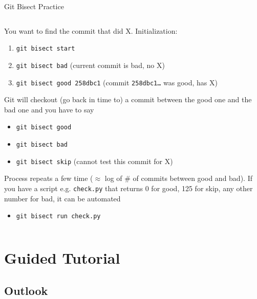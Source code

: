 \documentclass[xetex]{beamer}
\begin{document}
\begin{frame}{Git Bisect Practice}
  \begin{columns}
    \begin{column}{\linewidth}
        You want to find the commit that did X. Initialization:
        \begin{enumerate}
          \item \texttt{git bisect start}
          \item \texttt{git bisect bad} (current commit is bad, no X)
          \item \texttt{git bisect good 258dbc1} (commit \texttt{258dbc1\ldots}
            was good, has X)
        \end{enumerate}
        \pause
        Git will checkout (go back in time to) a commit between the good one
        and the bad one and you have to say
        \begin{itemize}
          \item \texttt{git bisect good}
          \item \texttt{git bisect bad}
          \item \texttt{git bisect skip} (cannot test this commit for X)
        \end{itemize}
        \pause
        Process repeats a few time ($\approx$ log of \# of commits between good
        and bad). If you have a script e.g. \texttt{check.py} that returns 0
        for good, 125 for skip, any other number for bad, it can be automated
        \begin{itemize}
          \item \texttt{git bisect run check.py}
        \end{itemize}
    \end{column}
  \end{columns}
\end{frame}

\section{Guided Tutorial}

\subsection{Outlook}
\end{document}
